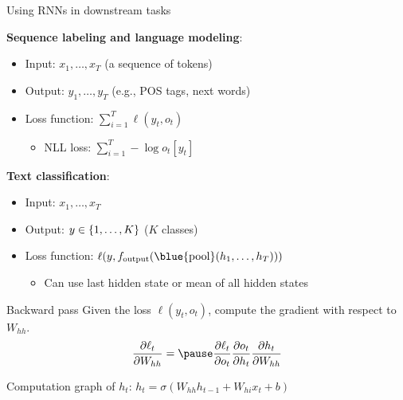 \documentclass[usenames,dvipsnames,notes,11pt,aspectratio=169,hyperref={colorlinks=true, linkcolor=blue}]{beamer}
\newcommand{\pt}{\partial}
\begin{document}
\begin{frame}
    {Using RNNs in downstream tasks}
    
    {\bf Sequence labeling and language modeling}:\\
    \begin{itemize}
        \item Input: $x_1, \ldots, x_T$ (a sequence of tokens)
        \item Output: $y_1, \ldots, y_T$ (e.g., POS tags, next words)
        \item Loss function: $\sum_{i=1}^T \ell(y_t, o_t)$
            \begin{itemize}
                \item NLL loss: $\sum_{i=1}^T -\log o_t[y_t]$
            \end{itemize}
    \end{itemize}

    \pause
    {\bf Text classification}:\\
    \begin{itemize}
        \item Input: $x_1, \ldots, x_T$
        \item Output: $y\in \left\{ 1,\ldots, K \right\}$ ($K$ classes)
        \item Loss function: $\ell(y, f_{\text{output}}(\blue{\mathrm{pool}}(h_1, \ldots, h_T)))$
            \begin{itemize}
                \item Can use last hidden state or mean of all hidden states
            \end{itemize}
    \end{itemize}

\end{frame}

\begin{frame}
    {Backward pass}
    Given the loss $\ell(y_t, o_t)$, compute the gradient with respect to $W_{hh}$.
    $$
    \frac{\pt\ell_t}{\pt W_{hh}} = \pause \frac{\pt\ell_t}{\pt o_t} \frac{\pt o_t}{\pt h_t} \frac{\pt h_t}{\pt W_{hh}}
    $$

    \pause
    Computation graph of $h_t$: $h_t = \sigma(W_{hh}h_{t-1} + W_{hi}x_t + b)$
    \vspace{10em}
\end{frame}
\end{document}
